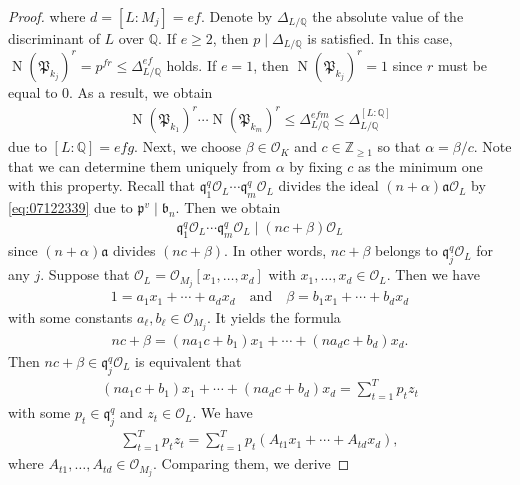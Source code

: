 \documentclass[a4paper,11pt]{amsart}
\theoremstyle{definition}
\numberwithin{equation}{section}
\DeclareMathOperator{\norm}{N}
\begin{document}
\begin{proof}
where $d=[L:M_j]=ef$. 
Denote by $\Delta_{L/\mathbb{Q}}$ the absolute value of the discriminant of $L$ over $\mathbb{Q}$. 
If $e \geq2$, then $p \mid \Delta_{L/\mathbb{Q}}$ is satisfied. 
In this case, $\norm(\mathfrak{P}_{k_j})^r = p^{fr} \leq \Delta_{L/\mathbb{Q}}^{ef}$ holds. 
If $e=1$, then $\norm(\mathfrak{P}_{k_j})^r=1$ since $r$ must be equal to $0$. 
As a result, we obtain
\begin{align}\label{eq:07130029}
\norm(\mathfrak{P}_{k_1})^r \cdots \norm(\mathfrak{P}_{k_m})^r
\leq \Delta_{L/\mathbb{Q}}^{efm}
\leq \Delta_{L/\mathbb{Q}}^{[L:\mathbb{Q}]} 
\end{align}
due to $[L:\mathbb{Q}]=efg$. 
Next, we choose $\beta \in \mathcal{O}_K$ and $c \in \mathbb{Z}_{\geq1}$ so that $\alpha=\beta/c$. 
Note that we can determine them uniquely from $\alpha$ by fixing $c$ as the minimum one with this property. 
Recall that $\mathfrak{q}_1^q \mathcal{O}_L \cdots \mathfrak{q}_m^q \mathcal{O}_L$ divides the ideal $(n+\alpha)\mathfrak{a} \mathcal{O}_L$ by \eqref{eq:07122339} due to $\mathfrak{p}^v \mid \mathfrak{b}_n$. 
Then we obtain
\begin{align*}
\mathfrak{q}_1^q \mathcal{O}_L \cdots \mathfrak{q}_m^q \mathcal{O}_L
\mid (nc+\beta) \mathcal{O}_L 
\end{align*}
since $(n+\alpha)\mathfrak{a}$ divides $(nc+\beta)$. 
In other words, $nc+\beta$ belongs to $\mathfrak{q}_j^q \mathcal{O}_L$ for any $j$. 
Suppose that $\mathcal{O}_L=\mathcal{O}_{M_j}[x_1, \ldots, x_d]$ with $x_1,\ldots,x_d \in \mathcal{O}_L$. 
Then we have 
\begin{align*}
1 
= a_1 x_1+\cdots+a_d x_d
\quad\text{and}\quad
\beta 
= b_1 x_1+\cdots+b_d x_d
\end{align*}
with some constants $a_\ell, b_\ell \in \mathcal{O}_{M_j}$. 
It yields the formula
\begin{align*}
nc+\beta
= (na_1 c+b_1)x_1+\cdots+(na_d c+b_d)x_d.
\end{align*}
Then $nc+\beta \in \mathfrak{q}_j^q \mathcal{O}_L$ is equivalent that 
\begin{align*}
(na_1 c+b_1)x_1+\cdots+(na_d c+b_d)x_d
= \sum_{t=1}^{T} p_t z_t
\end{align*}
with some $p_t \in \mathfrak{q}_j^q$ and $z_t \in \mathcal{O}_L$. 
We have 
\begin{align*}
\sum_{t=1}^{T} p_t z_t
= \sum_{t=1}^{T} p_t (A_{t 1} x_1+\cdots+A_{t d} x_d), 
\end{align*}
where $A_{t 1}, \ldots, A_{t d} \in \mathcal{O}_{M_j}$. 
Comparing them, we derive 

\end{proof}
\end{document}
